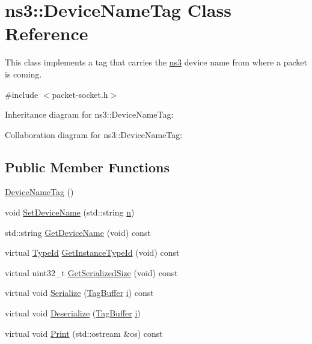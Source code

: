 \hypertarget{classns3_1_1DeviceNameTag}{}\section{ns3\+:\+:Device\+Name\+Tag Class Reference}
\label{classns3_1_1DeviceNameTag}


This class implements a tag that carries the \hyperlink{namespacens3}{ns3} device name from where a packet is coming.  




{\ttfamily \#include $<$packet-\/socket.\+h$>$}



Inheritance diagram for ns3\+:\+:Device\+Name\+Tag\+:


Collaboration diagram for ns3\+:\+:Device\+Name\+Tag\+:
\subsection*{Public Member Functions}
\begin{DoxyCompactItemize}
\item 
\hyperlink{classns3_1_1DeviceNameTag_a023d5a991846b1bf186eb111b98eb0a8}{Device\+Name\+Tag} ()
\item 
void \hyperlink{classns3_1_1DeviceNameTag_a8f1b4fc7c7ec38447d3a478aca9a8fda}{Set\+Device\+Name} (std\+::string \hyperlink{lte__link__budget__x2__handover__measures_8m_abdb05bc5a064cf642a06c83b3392f148}{n})
\item 
std\+::string \hyperlink{classns3_1_1DeviceNameTag_a6e262c53f81371be5e9bcfa7845e390b}{Get\+Device\+Name} (void) const 
\item 
virtual \hyperlink{classns3_1_1TypeId}{Type\+Id} \hyperlink{classns3_1_1DeviceNameTag_aa3fb346576163a62f3b99641de4febc8}{Get\+Instance\+Type\+Id} (void) const 
\item 
virtual uint32\+\_\+t \hyperlink{classns3_1_1DeviceNameTag_acb3a9637ef207037ffef1759ca403c3e}{Get\+Serialized\+Size} (void) const 
\item 
virtual void \hyperlink{classns3_1_1DeviceNameTag_a0040d1483b4453fff6622144546e5b7a}{Serialize} (\hyperlink{classns3_1_1TagBuffer}{Tag\+Buffer} \hyperlink{lte__uplink__power__control_8m_a6f6ccfcf58b31cb6412107d9d5281426}{i}) const 
\item 
virtual void \hyperlink{classns3_1_1DeviceNameTag_a4a07f0398eacffcd5170643822cc0c79}{Deserialize} (\hyperlink{classns3_1_1TagBuffer}{Tag\+Buffer} \hyperlink{lte__uplink__power__control_8m_a6f6ccfcf58b31cb6412107d9d5281426}{i})
\item 
virtual void \hyperlink{classns3_1_1DeviceNameTag_a3275b21ec97cc7fbd407b215569ceb63}{Print} (std\+::ostream \&os) const 
\end{DoxyCompactItemize}

